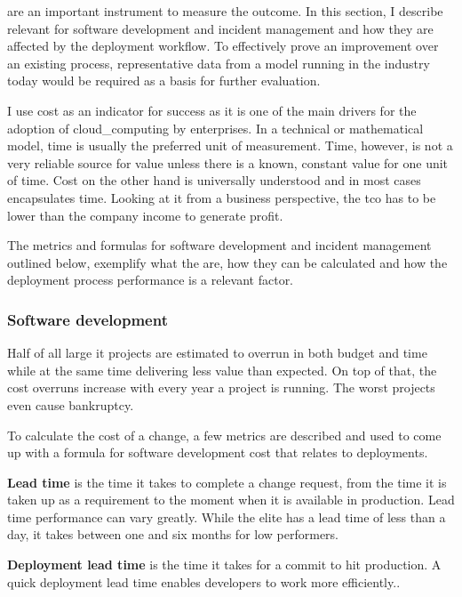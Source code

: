 \documentclass[../main.tex]{subfiles}
\begin{document}
     are an important instrument to measure the outcome.
    In this section, I describe relevant  for software development and incident management and how they are affected by the deployment workflow.
    To effectively prove an improvement over an existing process, representative data from a model running in the industry today would be required as a basis for further evaluation.

    I use cost as an indicator for success as it is one of the main drivers for the adoption of \gls{cloud_computing} by enterprises\cite{hc_patterns}.
    In a technical or mathematical model, time is usually the preferred unit of measurement.
    Time, however, is not a very reliable source for value unless there is a known, constant value for one unit of time.
    Cost on the other hand is universally understood and in most cases encapsulates time.
    Looking at it from a business perspective, the \acrlong{tco} has to be lower than the company income to generate profit.

    The metrics and formulas for software development and incident management outlined below, exemplify what the  are, how they can be calculated and how the deployment process performance is a relevant factor.

    \subsubsection{Software development}

    Half of all large \acrshort{it} projects are estimated to overrun in both budget and time while at the same time delivering less value than expected.
    On top of that, the cost overruns increase with every year a project is running.
    The worst projects even cause bankruptcy.\cite{projects_overrun}

    To calculate the cost of a change, a few metrics are described and used to come up with a formula for software development cost that relates to deployments.

    \textbf{Lead time}
    is the time it takes to complete a change request, from the time it is taken up as a requirement to the moment when it is available in production.
    Lead time performance can vary greatly.
    While the elite has a lead time of less than a day, it takes between one and six months for low performers.\cite{four_key_metrics,state_of_devops_19}

    \textbf{Deployment lead time}
    is the time it takes for a commit to hit production.
    A quick deployment lead time enables developers to work more efficiently.\cite{devops_handbook_1}.
\end{document}

